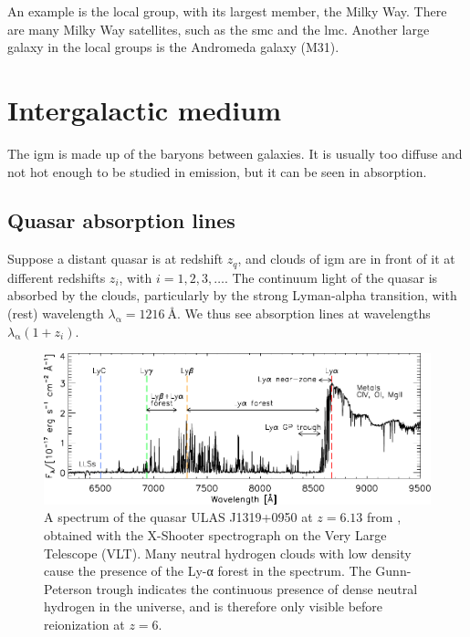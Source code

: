 An example is the local group, with its largest member, the Milky Way.
There are many Milky Way satellites, such as the \ac{smc} and the \ac{lmc}.
Another large galaxy in the local groups is the Andromeda galaxy (M31).






\section{Intergalactic medium}

The \ac{igm} is made up of the baryons between galaxies.
It is usually too diffuse and not hot enough to be studied in emission,
but it can be seen in absorption.

\subsection{Quasar absorption lines}
Suppose a distant quasar is at redshift $z_q$, and clouds of \ac{igm} are in front of it at different redshifts $z_i$, with $i = 1, 2, 3, \dots$.
The continuum light of the quasar is absorbed by the clouds, particularly by the strong Lyman-alpha transition, with (rest) wavelength $\lambda_\mathrm{α} = \SI{1216}{\angstrom}$.
We thus see absorption lines at wavelengths $\lambda_\mathrm{α} (1 + z_i)$.

\begin{figure}
	\includegraphics[width=\textwidth]{img/ch-05/quasar-spectrum.pdf}
	\caption{A spectrum of the quasar ULAS J1319+0950 at $z=6.13$ from \cite{becker2015reionization}, obtained with the X-Shooter spectrograph on the Very Large Telescope (VLT). 
	Many neutral hydrogen clouds with low density cause the presence of the Ly-α forest in the spectrum. 
	The Gunn-Peterson trough indicates the continuous presence of dense neutral hydrogen in the universe, and is therefore only visible before reionization at $z=6$.}
	\label{fig:quasar-spectrum}
\end{figure}

